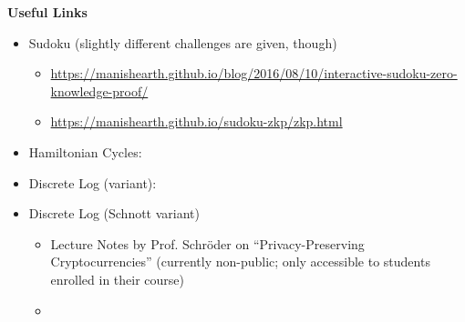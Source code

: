 \documentclass[]{standalone}
\begin{document}
\begin{threeparttable}
\begin{tablenotes}
	\item \textbf{Useful Links}\begin{itemize}
		\item Sudoku (slightly different challenges are given, though)\begin{itemize}
			\item \url{https://manishearth.github.io/blog/2016/08/10/interactive-sudoku-zero-knowledge-proof/}
			\item \url{https://manishearth.github.io/sudoku-zkp/zkp.html}
		\end{itemize}
		\item Hamiltonian Cycles: \cite{wiki:zero-knowledge-proofs-hamiltonian-graphs}
		\item Discrete Log (variant): \cite{wiki:zero-knowledge-proofs-discrete-log}
		\item Discrete Log (Schnott variant)\begin{itemize}
			\item Lecture Notes by Prof. Schröder on \enquote{Privacy-Preserving Cryptocurrencies} (currently non-public; only accessible to students enrolled in their course)
			\item \cite{SchnorrZeroKnowledge}
		\end{itemize}
	\end{itemize}

	\item \printbibliography
\end{tablenotes}
\end{threeparttable}
\end{document}
